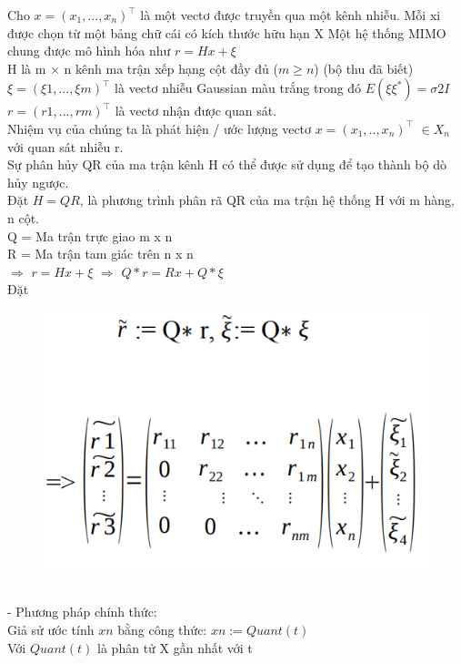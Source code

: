 Cho $x = (x_1,..., x_n)^\intercal$ là một vectơ được truyền qua một kênh nhiễu.
Mỗi xi được chọn từ một bảng chữ cái có kích thước hữu hạn X
Một hệ thống MIMO chung được mô hình hóa như $r=Hx+\xi$\\
H là m × n kênh ma trận xếp hạng cột đầy đủ ($m \geq n$) (bộ thu đã biết)\\
$\xi = (\xi 1,...,\xi m)^\intercal$ là vectơ nhiễu Gaussian màu trắng trong đó $E(\xi\xi^{*})=\sigma2I$\\
$r=(r1,...,rm)^\intercal$ là vectơ nhận được quan sát.\\
Nhiệm vụ của chúng ta là phát hiện / ước lượng vectơ $x = (x_1,.., x_n)^\intercal$ $\in X_n$ với quan 
sát nhiễu r.\\
Sự phân hủy QR của ma trận kênh H có thể được sử dụng để tạo thành bộ dò hủy 
ngược.\\
Đặt $H = QR$, là phương trình phân rã QR của ma trận hệ thống H với m hàng, n cột.\\
Q = Ma trận trực giao m x n\\
R = Ma trận tam giác trên n x n\\
$\Rightarrow$ $r=Hx+\xi $ $\Rightarrow$ $Q*r=Rx+Q*\xi$\\
Đặt \begin{figure}[!ht]
	
	\includegraphics[scale=0.27]{uuu}
\end{figure}\\
- Phương pháp chính thức:\\
Giả sử ước tính $xn$ bằng công thức: $xn:=Quant(t)$\\
Với $Quant(t)$ là phân tử X gần nhất với t\\
